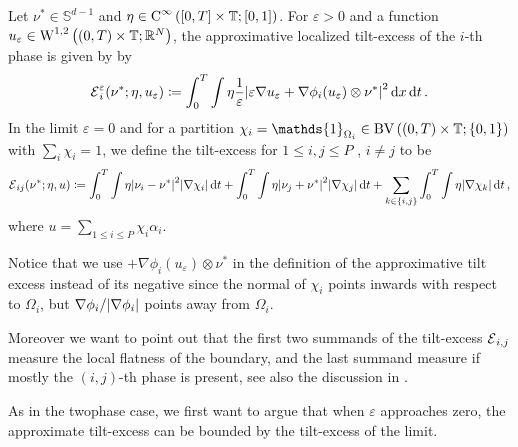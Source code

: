 \begin{definition}
	Let $ \nu^{ \ast } \in \mathbb{ S }^{ d - 1 } $ and $ \eta \in \operatorname{C}^{ 
	\infty } \left( [ 0 , T ] \times \operatorname{\mathbb{T}} ; [ 0 , 1 ] \right) $. For $ 
	\varepsilon > 0 $ and a function $ u_{ \varepsilon } \in \operatorname{W}^{ 1 , 2 } 
	\left( ( 0 , T ) \times \operatorname{\mathbb{T}} ; \mathbb{ R }^{ N } \right) $, the 
	approximative localized tilt-excess of the $ i$-th phase is given by by
	\begin{equation*}
		\tilt_excess_{ i }^{ \varepsilon } ( \nu^{ \ast } ; \eta , u_{ 
		\varepsilon } )
		\coloneqq
		\int_{ 0 }^{ T }
			\int
				\eta
				\frac{ 1 }{ \varepsilon }
				\abs{ 
					\varepsilon \nabla u_{ \varepsilon } 
					+
					\nabla \phi_{ i } ( u_{ \varepsilon } ) 
					\otimes
					\nu^{ \ast }
				}^{ 2 }
			\dd{ x }
		\dd{ t }.
	\end{equation*}
	In the limit $ \varepsilon = 0 $ and for a partition 
	$ \chi_{ i } = \mathds{ 1 }_{ \Omega_{ i } } \in \bv \left(
		( 0 , T ) \times \flattorus ; \{ 0 , 1 \} 
	\right) $
	with $ \sum_{ i } \chi_{ i } = 1 $,
	we define the tilt-excess for $ 1 \leq i, j \leq P $ , $ i \neq j $ to be
	\begin{equation*}
		\tilt_excess_{ i j } ( \nu^{ \ast } ; \eta , u ) 
		\coloneqq
		\int_{ 0 }^{ T }
			\int
				\eta
				\abs{ \nu_{ i } - \nu^{ \ast } }^{ 2 }
			\abs{ \nabla \chi_{ i } }
		\dd{ t }
		+
		\int_{ 0 }^{ T }
			\int
				\eta
				\abs{ \nu_{ j } + \nu^{ \ast } }^{ 2 }
			\abs{ \nabla \chi_{ j } }
		\dd{ t }
		+
		\sum_{ k \in \{ i , j \} }
			\int_{ 0 }^{ T }
				\int
					\eta 
				\abs{ \nabla \chi_{ k } }
			\dd{ t },
	\end{equation*}
	where $ u = \sum_{ 1 \leq i \leq P } \chi_{ i } \alpha_{ i } $.
\end{definition}

Notice that we use $ + \nabla \phi_{ i } ( u_{ \varepsilon } ) \otimes \nu^{ 
\ast } $ in the definition of the approximative tilt excess instead of its 
negative since the normal of $ \chi_{ i } $ points inwards with respect to $ 
\Omega_{ i } $, but $ \nabla \phi_{ i } / \abs{ \nabla \phi_{ i } } $ points 
away from $ \Omega_{ i } $.

Moreover we want to point out that the first two summands of the tilt-excess $ 
\tilt_excess_{ i , j } $ measure the local flatness of the boundary, and the 
last summand measure if mostly the $(i,j)$-th phase is present, see also the 
discussion in .

As in the twophase case, we first want to argue that when $ \varepsilon $ 
approaches zero, the approximate tilt-excess can be bounded by the tilt-excess 
of the limit.

